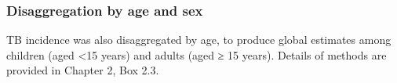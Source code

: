 \subsubsection{Disaggregation by age and sex}

TB incidence was also disaggregated by age, to produce global estimates among children (aged <15 years) and adults (aged ≥ 15 years). Details of methods are provided in Chapter 2, Box 2.3.  
